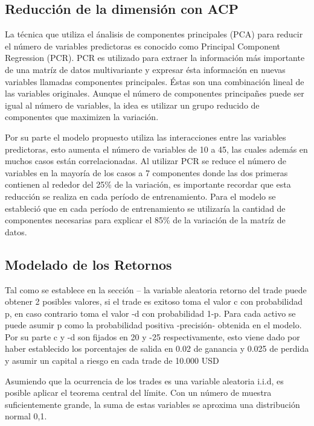 \documentclass[a4paper,12pt]{Latex/Classes/PhDthesisPSnPDF}
\begin{document}
\subsection{Reducción de la dimensión con ACP}

La técnica que utiliza el ánalisis de componentes principales (PCA) para reducir el número de variables predictoras es conocido como Principal Component Regression (PCR). PCR es utilizado para extraer la información más importante de una matríz de datos multivariante y expresar ésta información en nuevas variables llamadas componentes principales. Éstas son una combinación lineal de las variables originales. Aunque el número de componentes principañes puede ser igual al número de variables, la idea es utilizar un grupo reducido de componentes que maximizen la variación.

Por su parte el modelo propuesto utiliza las interacciones entre las variables predictoras, esto aumenta el número de variables de 10 a 45, las cuales además en muchos casos están correlacionadas. Al utilizar PCR se reduce el número de variables en la mayoría de los casos a 7 componentes donde las dos primeras contienen al rededor del 25\% de la variación, es importante recordar que esta reducción se realiza en cada período de entrenamiento. Para el modelo se estableció que en cada período de entrenamiento se utilizaría la cantidad de componentes necesarias para explicar el 85\% de la variación de la matríz de datos.

\subsection{Modelado de los Retornos}

Tal como se establece en la sección -- la variable aleatoria retorno del trade puede obtener 2 posibles valores, si el trade es exitoso toma el valor c con probabilidad p, en caso contrario toma el valor -d con probabilidad 1-p. Para cada activo se puede asumir p como la probabilidad positiva -precisión- obtenida en el modelo. Por su parte c y -d son fijados en 20 y -25 respectivamente, esto viene dado por haber establecido los porcentajes de salida en 0.02 de ganancia y 0.025 de perdida y asumir un capital a riesgo en cada trade de 10.000 USD

Asumiendo que la ocurrencia de los trades es una variable aleatoria i.i.d, es posible aplicar el teorema central del límite. Con un número de muestra suficientemente grande, la suma de estas variables se aproxima una distribución normal 0,1.
\end{document}

